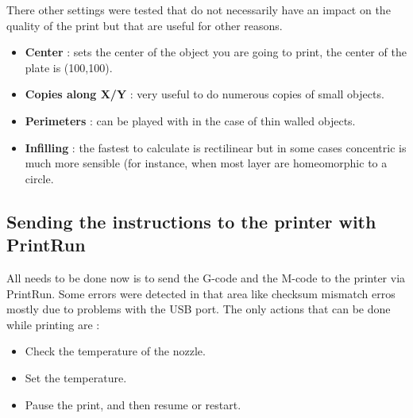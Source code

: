 \documentclass{article}
\begin{document}
There other settings were tested that do not necessarily have an impact on the quality of the print but that are useful for other reasons.
\begin{itemize}
\item \textbf{Center} : sets the center of the object you are going to print, the center of the plate is (100,100).
\item \textbf{Copies along X/Y} : very useful to do numerous copies of small objects.
\item \textbf{Perimeters} : can be played with in the case of thin walled objects.
\item \textbf{Infilling} : the fastest to calculate is rectilinear but in some cases concentric is much more sensible (for instance, when most layer are homeomorphic to a circle.
\end{itemize}

\subsection{Sending the instructions to the printer with PrintRun}
All needs to be done now is to send the G-code and the M-code to the printer via PrintRun. Some errors were detected in that area like checksum mismatch erros mostly due to problems with the USB port. The only actions that can be done while printing are :
\begin{itemize}
\item Check the temperature of the nozzle.
\item Set the temperature.
\item Pause the print, and then resume or restart.
\end{itemize}
\end{document}
